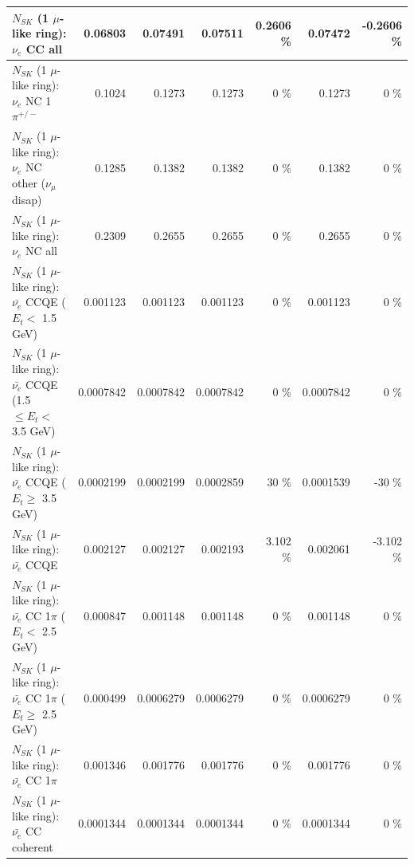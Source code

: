 \begin{table}
\begin{tabular}{| l | r | r | r  r | r  r |}
                                  $N_{SK}$ (1 $\mu$-like ring): $\nu_{e}$ CC all &         0.06803 &         0.07491 &         0.07511 &   0.2606 \%  &         0.07472 &  -0.2606 \%  \\ 
\hline
                           $N_{SK}$ (1 $\mu$-like ring): $\nu_e$ NC 1$\pi^{+/-}$ &          0.1024 &          0.1273 &          0.1273 &        0 \%  &          0.1273 &        0 \%  \\ 
                $N_{SK}$ (1 $\mu$-like ring): $\nu_e$ NC other ($\nu_\mu$ disap) &          0.1285 &          0.1382 &          0.1382 &        0 \%  &          0.1382 &        0 \%  \\ 
                                  $N_{SK}$ (1 $\mu$-like ring): $\nu_{e}$ NC all &          0.2309 &          0.2655 &          0.2655 &        0 \%  &          0.2655 &        0 \%  \\ 
\hline
\hline
\hline
            $N_{SK}$ (1 $\mu$-like ring): $\bar{\nu_e}$ CCQE ($E_{t} <$ 1.5 GeV) &        0.001123 &        0.001123 &        0.001123 &        0 \%  &        0.001123 &        0 \%  \\ 
   $N_{SK}$ (1 $\mu$-like ring): $\bar{\nu_e}$ CCQE (1.5 $\leq E_{t} <$ 3.5 GeV) &       0.0007842 &       0.0007842 &       0.0007842 &        0 \%  &       0.0007842 &        0 \%  \\ 
         $N_{SK}$ (1 $\mu$-like ring): $\bar{\nu_e}$ CCQE ($E_{t} \geq$ 3.5 GeV) &       0.0002199 &       0.0002199 &       0.0002859 &       30 \%  &       0.0001539 &      -30 \%  \\ 
\hline
                                $N_{SK}$ (1 $\mu$-like ring): $\bar{\nu_e}$ CCQE &        0.002127 &        0.002127 &        0.002193 &    3.102 \%  &        0.002061 &   -3.102 \%  \\ 
\hline
       $N_{SK}$ (1 $\mu$-like ring): $\bar{\nu_e}$ CC 1$\pi$ ($E_{t} <$ 2.5 GeV) &        0.000847 &        0.001148 &        0.001148 &        0 \%  &        0.001148 &        0 \%  \\ 
    $N_{SK}$ (1 $\mu$-like ring): $\bar{\nu_e}$ CC 1$\pi$ ($E_{t} \geq$ 2.5 GeV) &        0.000499 &       0.0006279 &       0.0006279 &        0 \%  &       0.0006279 &        0 \%  \\ 
\hline
                           $N_{SK}$ (1 $\mu$-like ring): $\bar{\nu_e}$ CC 1$\pi$ &        0.001346 &        0.001776 &        0.001776 &        0 \%  &        0.001776 &        0 \%  \\ 
                         $N_{SK}$ (1 $\mu$-like ring): $\bar{\nu_e}$ CC coherent &       0.0001344 &       0.0001344 &       0.0001344 &        0 \%  &       0.0001344 &        0 \%  \\ 

\end{tabular}
\end{table}
